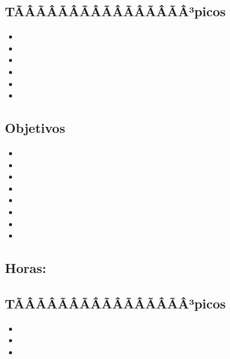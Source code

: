 \subsection*{TÃÂÃÂÃÂÃÂÃÂÃÂÃÂÃÂ³picos}
\begin{itemize}
	\item \PFCUATROTopicEl
	\item \PFCUATROTopicFunciones
	\item \PFCUATROTopicProcedimientos
	\item \PFCUATROTopicEstrategias
	\item \PFCUATROTopicBacktracking
	\item \PFCUATROTopicImplementacion
\end{itemize}

\subsection*{Objetivos}
\begin{itemize}
	\item \PFCUATROObjUNO
	\item \PFCUATROObjDOS
	\item \PFCUATROObjTRES
	\item \PFCUATROObjCUATRO
	\item \PFCUATROObjCINCO
	\item \PFCUATROObjSEIS
	\item \PFCUATROObjSIETE
	\item \PFCUATROObjOCHO
\end{itemize}

\subsection{\PFCINCODef}\label{sec:BOK-PF5}
\subsection*{Horas: \PFCINCOHours}

\subsection*{TÃÂÃÂÃÂÃÂÃÂÃÂÃÂÃÂ³picos}
\begin{itemize}
	\item \PFCINCOTopicMetodos
	\item \PFCINCOTopicPropagacion
	\item \PFCINCOTopicManejo
\end{itemize}


